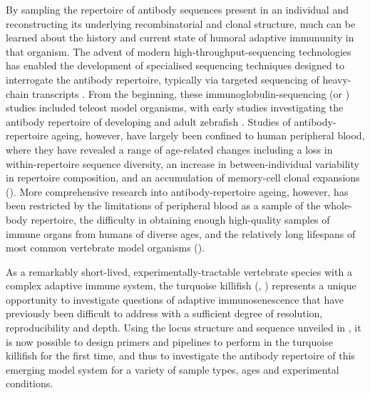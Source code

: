 By sampling the repertoire of antibody sequences present in an individual and reconstructing its underlying recombinatorial and clonal structure, much can be learned about the history and current state of humoral adaptive immununity in that organism.
The advent of modern high-throughput-sequencing technologies has enabled the development of specialised sequencing techniques designed to interrogate the antibody repertoire, typically via targeted sequencing of heavy-chain transcripts  \parencite{vollmers2013consensus,turchaninova2016igprep}. From the beginning, these immunoglobulin-sequencing (or \igseq) studies included teleost model organisms, with early \igseq studies investigating the antibody repertoire of developing and adult zebrafish \parencite{weinstein2009igseq,jiang2011determinism}. Studies of antibody-repertoire ageing, however, have largely been confined to human peripheral blood, where they have revealed a range of age-related changes including a loss in within-repertoire sequence diversity, an increase in between-individual variability in repertoire composition, and an accumulation of memory-cell clonal expansions (). More comprehensive research into antibody-repertoire ageing, however, has been restricted by the limitations of peripheral blood as a sample of the whole-body repertoire, the difficulty in obtaining enough high-quality samples of immune organs from humans of diverse ages, and the relatively long lifespans of most common vertebrate model organisms (). 

As a remarkably short-lived, experimentally-tractable vertebrate species with a complex adaptive immune system, the turquoise killifish (\nfu, ) represents a unique opportunity to investigate questions of adaptive immunosenescence that have previously been difficult to address with a sufficient degree of resolution, reproducibility and depth. Using the \igh{} locus structure and sequence unveiled in , it is now possible to design primers and pipelines to perform \igseq in the turquoise killifish for the first time, and thus to investigate the antibody repertoire of this emerging model system for a variety of sample types, ages and experimental conditions.

